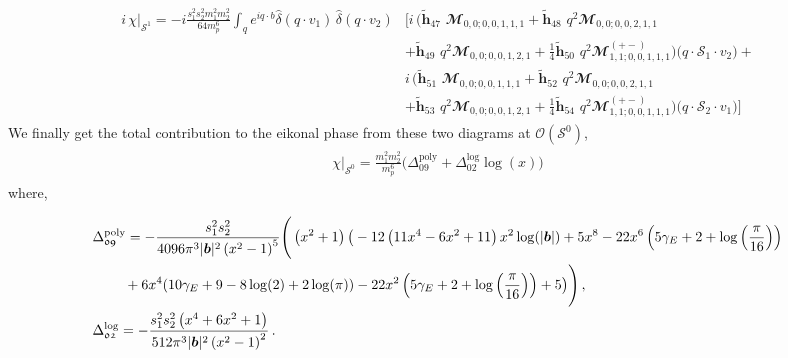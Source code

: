 \begin{align}
    \begin{split}
       i\, \chi\Big|_{\mathcal{S}^1}=-i \frac{s_1^2 s_2^2 m_1^2 m_2^2}{64 m_p^6} \int_{q}e^{i q\cdot b}\hat\delta(q\cdot v_1)\,\hat\delta(q\cdot v_2)&\Bigg[i\,\Bigg(\boldsymbol{\tilde h}_{47}\,\,\mathbfcal{M}_{0,0;0,0,1,1,1}+\boldsymbol{\tilde h}_{48}\,\,q^2\mathbfcal{M}_{0,0;0,0,2,1,1}\\&+\boldsymbol{\tilde h}_{49}\,\,q^2\mathbfcal{M}_{0,0;0,0,1,2,1}+\frac{1}{4}\boldsymbol{\tilde h}_{50}\,\,q^2\mathbfcal{M}^{(+-)}_{1,1;0,0,1,1,1}\Bigg)\big(q\cdot\mathcal{S}_1\cdot v_2\big)+\\&i\,\Bigg(\boldsymbol{\tilde h}_{51}\,\,\mathbfcal{M}_{0,0;0,0,1,1,1}+\boldsymbol{\tilde h}_{52}\,\,q^2\mathbfcal{M}_{0,0;0,0,2,1,1}\\&+\boldsymbol{\tilde h}_{53}\,\,q^2\mathbfcal{M}_{0,0;0,0,1,2,1}+\frac{1}{4}\boldsymbol{\tilde h}_{54}\,\,q^2\mathbfcal{M}^{(+-)}_{1,1;0,0,1,1,1}\Bigg)\big(q\cdot\mathcal{S}_2\cdot v_1\big)\Bigg]
    \end{split}
\end{align}
We finally get the total contribution to the eikonal phase from these two diagrams at $\mathcal{O}(\mathcal{S}^0)$, 
\begin{align}
\begin{split} \label{eqt7}
 \chi\Big|_{\mathcal{S}^0} =\frac{m_1^2m_2^2}{m_p^6}\Bigg(\Delta_{\mathfrak{09}}^{\textrm{poly}}+\Delta_{\mathfrak{02}}^{\textrm{log}}\log (x)\Bigg)
\end{split}
\end{align}
\enlargethispage{2\baselineskip}
where, 
\begin{thesiscompactdisplay}
\begin{align}
\begin{split}
&\Delta_{\mathfrak{09}}^{\textrm{poly}}=-\frac{s_1^2 s_2^2}{4096 \pi ^3 |\boldsymbol{b}|^2 \left(x^2-1\right)^5}\Bigg(\left(x^2+1\right) \big(-12 \left(11 x^4-6 x^2+11\right) x^2 \log (|\boldsymbol{b}|)+5 x^8-22 x^6 \left(5 \gamma_E +2+\log \left(\frac{\pi }{16}\right)\right)\\&\hspace{0.8cm}+6 x^4 (10 \gamma_E +9-8 \log (2)+2 \log (\pi ))-22 x^2 \left(5 \gamma_E +2+\log \left(\frac{\pi }{16}\right)\right)+5\big)\Bigg)\,,\\&
\Delta_{\mathfrak{02}}^{\textrm{log}}=-\frac{s_1^2 s_2^2 \left(x^4+6 x^2+1\right)}{512 \pi ^3 |\boldsymbol{b}|^2 \left(x^2-1\right)^2}\,.
\end{split}
\end{align}
\end{thesiscompactdisplay}
